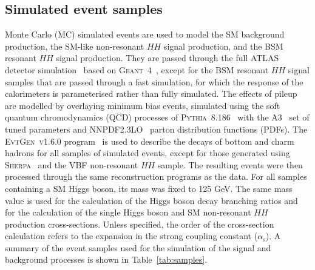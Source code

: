 \subsection{Simulated event samples}
\label{sec:DiHiggs:simulation}
Monte Carlo (MC) simulated events are used 
to model the SM background production,
the SM-like non-resonant $HH$ signal production, 
and the BSM resonant $HH$ signal production.
They are passed through the full ATLAS detector simulation~\cite{SOFT-2010-01}
based on \textsc{Geant~4}~\cite{Agostinelli:2002hh}, 
except for the BSM resonant $HH$ signal samples
that are passed through a fast simulation, 
for which the response of the calorimeters is parameterised
rather than fully simulated.
The effects of pileup are modelled by overlaying minimum bias events, 
simulated using the soft quantum chromodynamics (QCD) processes
of \textsc{Pythia~8.186}~\cite{Sjostrand:2007gs} with the A3~\cite{ATL-PHYS-PUB-2016-017}
set of tuned parameters and \textsc{NNPDF2.3LO}~\cite{Ball:2012cx} parton distribution functions (PDFs).
The \textsc{EvtGen~v1.6.0} program~\cite{Lange:2001uf}
is used to describe the decays of bottom and charm hadrons
for all samples of simulated events, except for those generated using
\textsc{Sherpa}~\cite{Bothmann:2019yzt} and the VBF non-resonant $HH$ sample.
The resulting events were then processed through 
the same reconstruction programs as the data.
For all samples containing a SM Higgs boson, 
its mass was fixed to 125 GeV.
The same mass value is used for the calculation of the Higgs boson decay branching ratios
and for the calculation of the single Higgs boson and SM non-resonant $HH$ production
cross-sections.
Unless specified, the order of the cross-section calculation
refers to the expansion in the strong coupling constant ($\alpha_\text{s}$).
A summary of the event samples used for the simulation of the signal and background
processes is shown in Table~\ref{tab:samples}.
